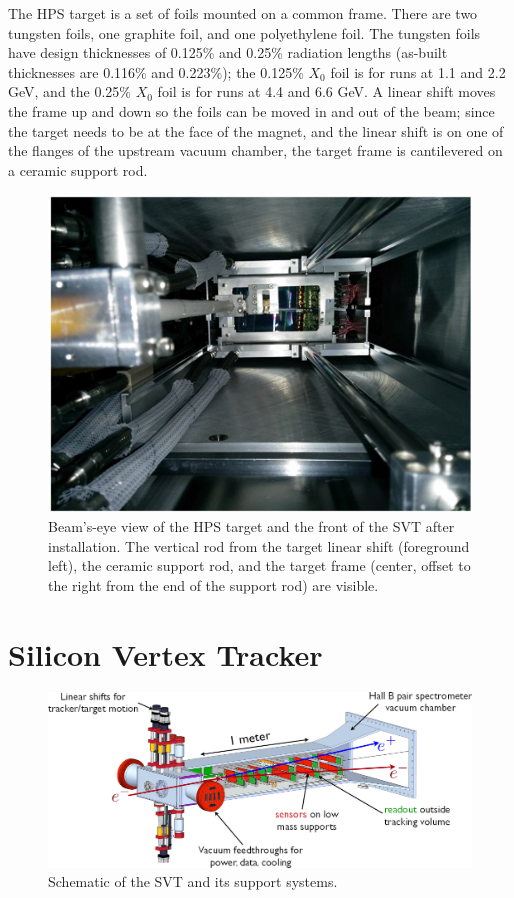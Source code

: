 The HPS target is a set of foils mounted on a common frame.
There are two tungsten foils, one graphite foil, and one polyethylene foil.
The tungsten foils have design thicknesses of 0.125\% and 0.25\% radiation lengths (as-built thicknesses are 0.116\% and 0.223\%); the 0.125\% $X_0$ foil is for runs at 1.1 and 2.2 GeV, and the 0.25\% $X_0$ foil is for runs at 4.4 and 6.6 GeV.
A linear shift moves the frame up and down so the foils can be moved in and out of the beam; since the target needs to be at the face of the magnet, and the linear shift is on one of the flanges of the upstream vacuum chamber, the target frame is cantilevered on a ceramic support rod.

\begin{figure}[htp]
    \includegraphics[width=\textwidth]{detector/figs/target_photo}
    \caption{Beam's-eye view of the HPS target and the front of the SVT after installation.
    The vertical rod from the target linear shift (foreground left), the ceramic support rod, and the target frame (center, offset to the right from the end of the support rod) are visible.
    }
    \label{fig:target_photo}
\end{figure}

\section{Silicon Vertex Tracker}

\begin{figure}[htp]
    \includegraphics[width=\textwidth]{detector/figs/svt_cutaway}
    \caption{Schematic of the SVT and its support systems.}
    \label{fig:svt-schematic}
\end{figure}

